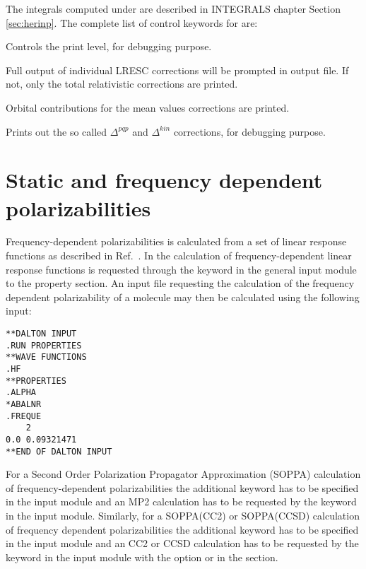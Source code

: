 The integrals computed under  are described in INTEGRALS chapter Section \ref{sec:herinp}.
The complete list of control keywords for  are:

\begin{list}{}{\itemsep 0.10cm \parsep 0.0cm}
\item[\Key{PRINT}] Controls the print level, for debugging purpose.
\item[\Key{PRTALL}] Full output of individual LRESC corrections will be prompted in output file. If not, only the total relativistic corrections are printed. 
\item[\Key{ORBCON}] Orbital contributions for the mean values corrections are printed.
\item[\Key{PQPKIN}] Prints out the so called $\Delta^{pqp}$ and $\Delta^{kin}$ corrections, for debugging purpose.
\end{list}

\section{Static and frequency dependent
polarizabilities}\label{sec:polari}

Frequency-dependent polarizabilities is
calculated from a set of linear
response functions as
described in Ref.~\cite{jopjjcp82}. In {\aba} the
calculation of frequency-dependent linear response functions is
requested through the keyword  in the general input
module to the property section. An input file requesting the calculation of the frequency
dependent polarizability of a molecule may then be calculated using
the following input:

\begin{verbatim}
**DALTON INPUT
.RUN PROPERTIES
**WAVE FUNCTIONS
.HF
**PROPERTIES
.ALPHA
*ABALNR
.FREQUE
    2
0.0 0.09321471
**END OF DALTON INPUT
\end{verbatim}

For a Second Order Polarization Propagator Approximation
(SOPPA)
\cite{esnpjjodjcp73,jopjdycpr2,mjpekdtehjajjojcp,ekdspasjpca102}
calculation of frequency-dependent polarizabilities the additional
keyword  has to be specified in the  input
module and an MP2 calculation has to be requested by the keyword
 in the  input module. Similarly, for a
SOPPA(CC2)  \cite{spas097}
 or SOPPA(CCSD) \cite{soppaccsd,ekdspasjpca102}
calculation of frequency dependent polarizabilities the additional
keyword  has to be specified in the 
input module and an CC2 or CCSD calculation has to be requested by the
keyword  in the  input module with the
option  or  in the  section.

